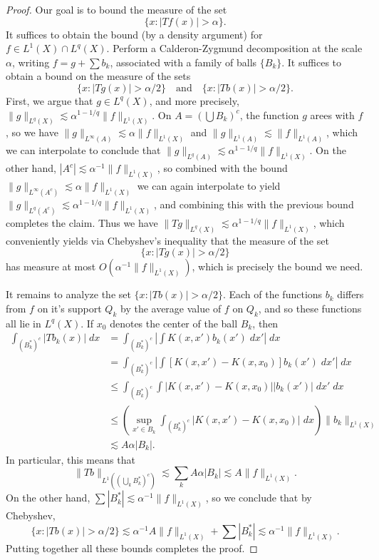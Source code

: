 \begin{proof}
    Our goal is to bound the measure of the set
    \[ \{ x : |Tf(x)| > \alpha \}. \]
    It suffices to obtain the bound (by a density argument) for $f \in L^1(X) \cap L^q(X)$. Perform a Calderon-Zygmund decomposition at the scale $\alpha$, writing $f = g + \sum b_k$, associated with a family of balls $\{ B_k \}$. It suffices to obtain a bound on the measure of the sets
    \[ \{ x : |Tg(x)| > \alpha/2 \} \quad\text{and}\quad \{ x : |Tb(x)| > \alpha/2 \}. \]
    First, we argue that $g \in L^q(X)$, and more precisely, $\| g \|_{L^q(X)} \lesssim \alpha^{1-1/q} \| f \|_{L^1(X)}$. On $A = (\bigcup B_k)^c$, the function $g$ arees with $f$, so we have $\| g \|_{L^\infty(A)} \lesssim \alpha \| f \|_{L^1(X)}$ and $\| g \|_{L^1(A)} \lesssim \| f \|_{L^1(A)}$, which we can interpolate to conclude that $\| g \|_{L^q(A)} \lesssim \alpha^{1-1/q} \| f \|_{L^1(X)}$. On the other hand, $|A^c| \lesssim \alpha^{-1} \| f \|_{L^1(X)}$, so combined with the bound $\| g \|_{L^\infty(A^c)} \lesssim \alpha \| f \|_{L^1(X)}$ we can again interpolate to yield $\| g \|_{L^q(A^c)} \lesssim \alpha^{1-1/q} \| f \|_{L^1(X)}$, and combining this with the previous bound completes the claim. Thus we have $\| Tg \|_{L^q(X)} \lesssim \alpha^{1-1/q} \| f \|_{L^1(X)}$, which conveniently yields via Chebyshev's inequality that the measure of the set
    \[ \{ x : |Tg(x)| > \alpha / 2 \} \]
    has measure at most $O(\alpha^{-1} \| f \|_{L^1(X)})$, which is precisely the bound we need.

    It remains to analyze the set $\{ x : |Tb(x)| > \alpha / 2 \}$. Each of the functions $b_k$ differs from $f$ on it's support $Q_k$ by the average value of $f$ on $Q_k$, and so these functions all lie in $L^q(X)$. If $x_0$ denotes the center of the ball $B_k$, then
    \begin{align*}
        \int_{(B_k^*)^c} |Tb_k(x)|\; dx &= \int_{(B_k^*)^c} \left| \int K(x,x') b_k(x')\; dx' \right|\; dx\\
        &= \int_{(B_k^*)^c} \left| \int [K(x,x') - K(x,x_0)] b_k(x')\; dx' \right|\; dx\\
        &\leq \int_{(B_k^*)^c} \int |K(x,x') - K(x,x_0)| |b_k(x')|\; dx'\; dx\\
        &\leq \left( \sup_{x' \in B_k} \int_{(B_k^*)^c} |K(x,x') - K(x,x_0)|\; dx \right) \| b_k \|_{L^1(X)}\\
        &\lesssim A \alpha |B_k|.
    \end{align*}
    In particular, this means that
    \[ \| Tb \|_{L^1((\bigcup_k B_k^*)^c)} \lesssim \sum_k A \alpha |B_k| \lesssim A \| f \|_{L^1(X)}. \]
    On the other hand, $\sum |B_k^*| \lesssim \alpha^{-1} \| f \|_{L^1(X)}$, so we conclude that by Chebyshev,
    \[ \{ x : |Tb(x)| > \alpha / 2 \} \lesssim \alpha^{-1} A \| f \|_{L^1(X)} + \sum |B_k^*| \lesssim \alpha^{-1} \| f \|_{L^1(X)}. \]
    Putting together all these bounds completes the proof.
\end{proof}

